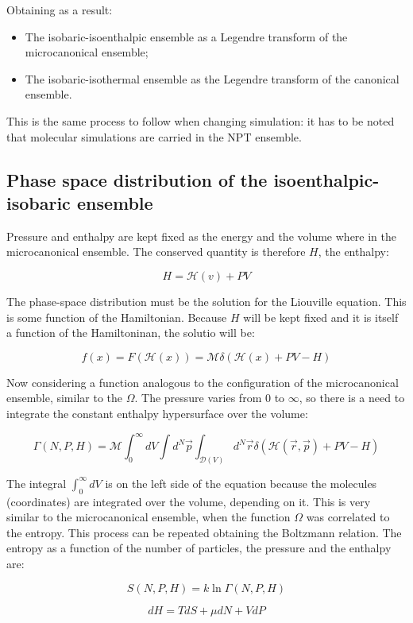 	Obtaining as a result:

	\begin{itemize}
	\item The isobaric-isoenthalpic ensemble as a Legendre transform of the microcanonical ensemble;
	\item The isobaric-isothermal ensemble as the Legendre transform of the canonical ensemble.
	\end{itemize}

	This is the same process to follow when changing simulation: it has to be noted that molecular simulations are carried in the NPT ensemble.

	\subsection{Phase space distribution of the isoenthalpic-isobaric ensemble}
	Pressure and enthalpy are kept fixed as the energy and the volume where in the microcanonical ensemble.
	The conserved quantity is therefore $H$, the enthalpy:

	$$H = \mathcal{H}(v) + PV$$

	The phase-space distribution must be the solution for the Liouville equation.
	This is some function of the Hamiltonian.
	Because $H$ will be kept fixed and it is itself a function of the Hamiltoninan, the solutio will be:

	$$f(x) = F(\mathcal{H}(x)) = \mathcal{M}\delta(\mathcal{H}(x)+PV-H)$$

	Now considering a function analogous to the configuration of the microcanonical ensemble, similar to the $\Omega$.
	The pressure varies from $0$ to $\infty$, so there is a need to integrate the constant enthalpy hypersurface over the volume:

	$$\Gamma(N, P, H) = \mathcal{M}\int_0^{\infty}dV\int d^N\vec{p}\int_{\mathcal{D}(V)}d^N\vec{r}\delta(\mathcal{H}(\vec{r}, \vec{p}) + PV-H)$$

	The integral $\int_0^{\infty}dV$ is on the left side of the equation because the molecules (coordinates) are integrated over the volume, depending on it.
	This is very similar to the microcanonical ensemble, when the function $\Omega$ was correlated to the entropy.
	This process can be repeated obtaining the Boltzmann relation.
	The entropy as a function of the number of particles, the pressure and the enthalpy are:

	$$S(N, P, H) = k \ln \Gamma(N, P, H)$$

	$$dH = TdS + \mu dN + VdP$$

